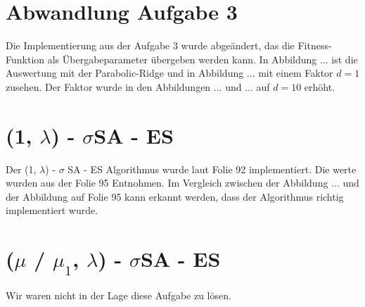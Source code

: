
\chapter{Abwandlung Aufgabe 3}

Die Implementierung aus der Aufgabe 3 wurde abgeändert, das die Fitness-Funktion als Übergabeparameter übergeben werden kann. In Abbildung  ... ist die Auswertung mit der Parabolic-Ridge und in Abbildung  ... mit einem Faktor $d=1$ zusehen. Der Faktor wurde in den Abbildungen  ... und  ... auf $d=10$ erhöht.



\chapter{(1, $\lambda$) - $\sigma$SA - ES}

Der (1, $\lambda$) - $\sigma$ SA - ES Algorithmus wurde laut Folie 92 implementiert. Die werte wurden aus der Folie 95 Entnohmen. Im Vergleich zwischen der Abbildung  ... und der Abbildung auf Folie 95 kann erkannt werden, dass der Algorithmus richtig implementiert wurde.


\chapter{($\mu$ / $\mu_1$, $\lambda$) - $\sigma$SA - ES}

Wir waren nicht in der Lage diese Aufgabe zu lösen.
